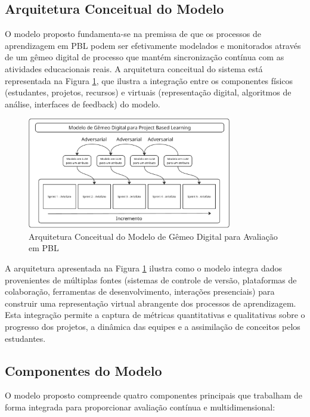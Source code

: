 \documentclass[12pt,a4paper]{article}
\begin{document}
\subsection{Arquitetura Conceitual do Modelo}

O modelo proposto fundamenta-se na premissa de que os processos de aprendizagem em PBL podem ser efetivamente modelados e monitorados através de um gêmeo digital de processo que mantém sincronização contínua com as atividades educacionais reais. A arquitetura conceitual do sistema está representada na Figura \ref{fig:modelo_proposto}, que ilustra a integração entre os componentes físicos (estudantes, projetos, recursos) e virtuais (representação digital, algoritmos de análise, interfaces de feedback) do modelo.

\begin{figure}[htbp]
\centering
\includegraphics[width=0.8\textwidth]{assets/f1.png}
\caption{Arquitetura Conceitual do Modelo de Gêmeo Digital para Avaliação em PBL}
\label{fig:modelo_proposto}
\end{figure}

A arquitetura apresentada na Figura \ref{fig:modelo_proposto} ilustra como o modelo integra dados provenientes de múltiplas fontes (sistemas de controle de versão, plataformas de colaboração, ferramentas de desenvolvimento, interações presenciais) para construir uma representação virtual abrangente dos processos de aprendizagem. Esta integração permite a captura de métricas quantitativas e qualitativas sobre o progresso dos projetos, a dinâmica das equipes e a assimilação de conceitos pelos estudantes.

\subsection{Componentes do Modelo}

O modelo proposto compreende quatro componentes principais que trabalham de forma integrada para proporcionar avaliação contínua e multidimensional:
\end{document}
